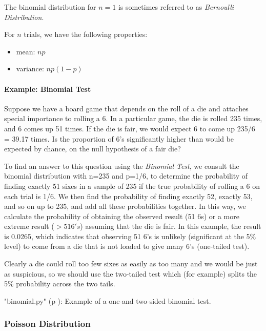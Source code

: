 The binomial distribution for $n = 1$ is sometimes referred to as \emph{Bernoulli Distribution}.

 For $n$ trials, we have the following properties:

 \begin{itemize}
   \item mean: $np$
   \item variance: $n p (1-p)$
 \end{itemize}

\paragraph{Example: Binomial Test}

Suppose we have a board game that depends on the roll of a die and attaches special importance to rolling a 6. In a particular game, the die is rolled 235 times, and 6 comes up 51 times. If the die is fair, we would expect 6 to come up 235/6 = 39.17 times. Is the proportion of 6's significantly higher than would be expected by chance, on the null hypothesis of a fair die?

To find an answer to this question using the \emph{Binomial Test}, we consult the binomial distribution with n=235 and p=1/6, to determine the probability of finding exactly 51 sixes in a sample of 235 if the true probability of rolling a 6 on each trial is 1/6. We then find the probability of finding exactly 52, exactly 53, and so on up to 235, and add all these probabilities together. In this way, we calculate the probability of obtaining the observed result (51 6s) or a more extreme result ($>51 6's$) assuming that the die is fair. In this example, the result is 0.0265, which indicates that observing 51 6's is unlikely (significant at the 5\% level) to come from a die that is not loaded to give many 6's (one-tailed test).

Clearly a die could roll too few sixes as easily as too many and we would be just as suspicious, so we should use the two-tailed test which (for example) splits the 5\% probability across the two tails.

\PyImg "binomial.py" (p \pageref{py:binomial}): Example of a one-and two-sided binomial test.


\subsubsection{Poisson Distribution}

